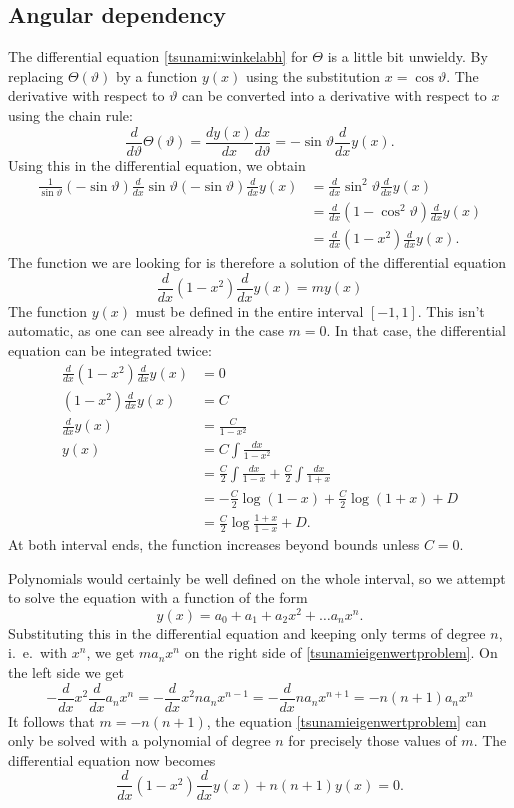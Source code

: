 \subsection{Angular dependency}
The differential equation \eqref{tsunami:winkelabh} for $\Theta$
is a little bit unwieldy.
By replacing $\Theta(\vartheta)$ by a function $y(x)$
using the substitution $x=\cos\vartheta$.
The derivative with respect to $\vartheta$ can be converted into
a derivative with respect to $x$ using the chain rule:
\[
\frac{d}{d\vartheta}\Theta(\vartheta)
=\frac{dy(x)}{dx}\frac{dx}{d\vartheta}
=-\sin\vartheta \frac{d}{dx} y(x).
\]
Using this in the differential equation, we obtain
\begin{align*}
\frac1{\sin\vartheta}
(-\sin{\vartheta})\frac{d}{dx}\sin\vartheta (-\sin\vartheta)
\frac{d}{dx}y(x)
&=
\frac{d}{dx}\sin^2\vartheta\frac{d}{dx}y(x)\\
&=
\frac{d}{dx}(1-\cos^2\vartheta)\frac{d}{dx}y(x)\\
&=
\frac{d}{dx}(1-x^2)\frac{d}{dx}y(x).
\end{align*}
The function we are looking for is therefore a solution of the
differential equation
\begin{equation}
\frac{d}{dx}(1-x^2)\frac{d}{dx}y(x)
=
my(x)
\label{tsunamieigenwertproblem}
\end{equation}
The function $y(x)$ must be defined in the entire interval $[-1,1]$.
This isn't automatic, as one can see already in the case $m=0$.
In that case, the differential equation can be integrated 
twice:
\begin{align*}
\frac{d}{dx}(1-x^2)\frac{d}{dx}y(x)&=0\\
(1-x^2)\frac{d}{dx}y(x)&=C\\
\frac{d}{dx}y(x)&=\frac{C}{1-x^2}\\
y(x)&=C\int\frac{dx}{1-x^2}\\
&=\frac{C}2\int\frac{dx}{1-x}+\frac{C}2\int\frac{dx}{1+x}\\
&=-\frac{C}2\log(1-x)+\frac{C}2\log(1+x) +D\\
&=\frac{C}2\log\frac{1+x}{1-x} + D.
\end{align*}
At both interval ends, the function increases beyond bounds
unless $C=0$.

Polynomials would certainly be well defined on the whole interval,
so we attempt to solve the equation with a function of the form
\[
y(x)=a_0+a_1+a_2x^2+\dots a_nx^n.
\]
Substituting this in the differential equation and keeping only
terms of degree $n$, i.~e.~with $x^n$, we get  $ma_nx^n$
on the right side of \eqref{tsunamieigenwertproblem}.
On the left side we get
\[
-\frac{d}{dx}x^2\frac{d}{dx}a_nx^n
=
-\frac{d}{dx}x^2na_nx^{n-1}
=
-\frac{d}{dx}na_nx^{n+1}
=
-n(n+1)a_nx^n
\]
It follows that $m=-n(n+1)$, the equation \eqref{tsunamieigenwertproblem}
can only be solved with a polynomial of degree $n$ for precisely those
values of $m$.
The differential equation now becomes
\begin{equation}
\frac{d}{dx}(1-x^2)\frac{d}{dx}y(x)+n(n+1)y(x)=0.
\label{legendredgl}
\end{equation}

